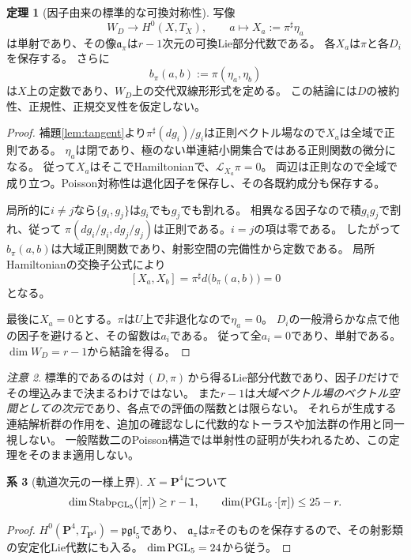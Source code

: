 \documentclass[a4paper,11pt]{ltjsarticle}
\theoremstyle{definition}
\newtheorem{theorem}{定理}[section]
\newtheorem{corollary}[theorem]{系}
\theoremstyle{definition}\newtheorem{definition}[theorem]{定義}
\theoremstyle{remark}\newtheorem{remark}[theorem]{注意}
\newcommand{\PP}{\mathbf P}\newcommand{\CC}{\mathbf C}
\newcommand{\Stab}{\operatorname{Stab}}\newcommand{\rank}{\operatorname{rank}}
\begin{document}
\begin{theorem}[因子由来の標準的な可換対称性]\label{thm:abelian}
写像
\[
 W_D\longrightarrow H^0(X,T_X),\qquad a\longmapsto X_a:=\pi^\sharp\eta_a
\]
は単射であり、その像$\mathfrak a_\pi$は$r-1$次元の可換Lie部分代数である。
各$X_a$は$\pi$と各$D_i$を保存する。
さらに
\[
 b_\pi(a,b):=\pi(\eta_a,\eta_b)
\]
は$X$上の定数であり、$W_D$上の交代双線形形式を定める。
この結論には$D$の被約性、正規性、正規交叉性を仮定しない。
\end{theorem}
\begin{proof}
補題\ref{lem:tangent}より$\pi^\sharp(dg_i)/g_i$は正則ベクトル場なので$X_a$は全域で正則である。
$\eta_a$は閉であり、極のない単連結小開集合ではある正則関数の微分になる。
従って$X_a$はそこでHamiltonianで、$\mathcal L_{X_a}\pi=0$。
両辺は正則なので全域で成り立つ。Poisson対称性は退化因子を保存し、その各既約成分も保存する。

局所的に$i\ne j$なら$\{g_i,g_j\}$は$g_i$でも$g_j$でも割れる。
相異なる因子なので積$g_ig_j$で割れ、従って
$\pi(dg_i/g_i,dg_j/g_j)$は正則である。$i=j$の項は零である。
したがって$b_\pi(a,b)$は大域正則関数であり、射影空間の完備性から定数である。
局所Hamiltonianの交換子公式により
\[
 [X_a,X_b]=\pi^\sharp d\bigl(b_\pi(a,b)\bigr)=0
\]
となる。

最後に$X_a=0$とする。$\pi$は$U$上で非退化なので$\eta_a=0$。
$D_i$の一般滑らかな点で他の因子を避けると、その留数は$a_i$である。
従って全$a_i=0$であり、単射である。$\dim W_D=r-1$から結論を得る。
\end{proof}

\begin{remark}
標準的であるのは対$\,(D,\pi)\,$から得るLie部分代数であり、因子$D$だけでその埋込みまで決まるわけではない。
また$r-1$は\emph{大域ベクトル場のベクトル空間としての次元}であり、各点での評価の階数とは限らない。
それらが生成する連結解析群の作用を、追加の確認なしに代数的なトーラスや加法群の作用と同一視しない。
一般階数二のPoisson構造では単射性の証明が失われるため、この定理をそのまま適用しない。
\end{remark}

\begin{corollary}[軌道次元の一様上界]\label{cor:orbit}
$X=\PP^4$について
\[
 \dim\Stab_{\PGL_5}([\pi])\ge r-1,\qquad
 \dim(\PGL_5\cdot[\pi])\le 25-r.
\]
\end{corollary}
\begin{proof}
$H^0(\PP^4,T_{\PP^4})=\mathfrak{pgl}_5$であり、
$\mathfrak a_\pi$は$\pi$そのものを保存するので、その射影類の安定化Lie代数にも入る。
$\dim\operatorname{PGL}_5=24$から従う。
\end{proof}
\end{document}
